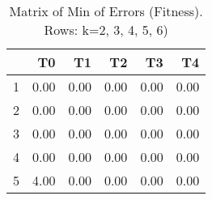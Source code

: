 \begin{table}[ht]
\centering
\begin{tabular}{rrrrrr}
  \hline
 & T0 & T1 & T2 & T3 & T4 \\ 
  \hline
1 & 0.00 & 0.00 & 0.00 & 0.00 & 0.00 \\ 
  2 & 0.00 & 0.00 & 0.00 & 0.00 & 0.00 \\ 
  3 & 0.00 & 0.00 & 0.00 & 0.00 & 0.00 \\ 
  4 & 0.00 & 0.00 & 0.00 & 0.00 & 0.00 \\ 
  5 & 4.00 & 0.00 & 0.00 & 0.00 & 0.00 \\ 
   \hline
\end{tabular}
\caption{Matrix of Min of Errors (Fitness). Rows: k=2, 3, 4, 5, 6)} 
\end{table}
